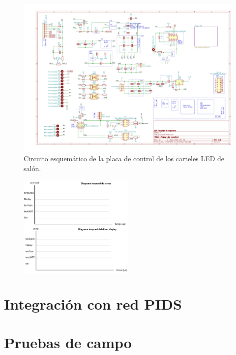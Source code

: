 \begin{figure}[ht]
	\centering
	\includegraphics[width=1\textwidth]{./Figures/output.placaControl.pdf}
	\caption{Circuito esquemático de la placa de control de los carteles LED de salón.}
	\label{fig:schController}
\end{figure}


\begin{figure}[ht]
	\centering
	\includegraphics[width=0.5\textwidth]{./Figures/diagramasTemporales.png}
	\caption{}
	\label{fig:diagramasTemporales}
\end{figure}

\section{Integración con red PIDS}

\section{Pruebas de campo}


